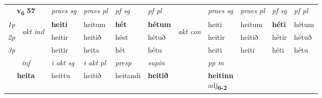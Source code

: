 \noindent
\begin{tabular}{lllllllllll} \toprule
\multicolumn{2}{c}{\textbf{v{\textsubscript{6}}} \Large{\textbf{57}}}  &  \textit{praes sg}  & \textit{praes pl}  &\textit{ pf sg} & \textit{pf pl} &  &  \textit{praes sg}  & \textit{praes pl}  & \textit{pf sg} & \textit{pf pl } \\*
	\cmidrule{3-6} \cmidrule{8-11}
 {\textit{1p}} & \multirow{3}{*}{\begin{turn}{90}\textit{akt ind}\end{turn}} & \textbf{heiti} & heitum & \textbf{hét} & \textbf{hétum} & \multirow{3}{*}{\begin{turn}{90}\textit{akt con}\end{turn}} &heiti & heitum & \textbf{héti} & hétum\\*
 {\textit{2p}} &  &  heitir  & heitið & hést & hétuð & & heitir & heitið & hétir & hétuð \\*
{\textit{3p}} &  & heitir & heita & hét & hétu & & heiti & heiti& héti & hétu \\*
\cmidrule{3-6} \cmidrule{8-11}

   \multicolumn{2}{c}{\textit{inf}}  & \textit{i akt sg} & \textit{i akt pl}   & \textit{presp} & \textit{supin}  && \textit{pp m} \\*
  \multicolumn{2}{c}{\textbf{heita}} & heittu  & heitið   & heitandi &  \textbf{heitið}  && \specialcell{\textbf{heitinn} \\ adj\textbf{\textsubscript{6-2}}} \\*
\end{tabular}

